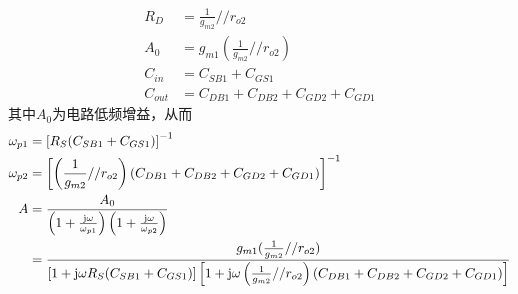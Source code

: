 \documentclass[hyperref, UTF8]{ctexart}
\newcommand{\under}[1]{\frac{1}{#1}}
\newcommand{\J}{{\rm j}}
\begin{document}
    \begin{align*}
        R_D & = \under{g_{m2}} // r_{o2} \\
        A_0 & = g_{m1}(\under{g_{m2}}//r_{o2}) \\
        C_{in} & = C_{SB1}+C_{GS1} \\
        C_{out} & = C_{DB1}+C_{DB2}+C_{GD2}+C_{GD1}
    \end{align*}
    其中$A_0$为电路低频增益，从而
    \begin{align*}
        \omega_{p1} & = \left[ R_S 
            (C_{SB1}+C_{GS1})
            \right] ^ {-1} \\
        \omega_{p2} & = \left[ \left(\under{g_{m2}} // r_{o2} \right)
            (C_{DB1}+C_{DB2}+C_{GD2}+C_{GD1})
            \right] ^ {-1}\\
        A & = \frac{A_0}{
            \left( 1 + \frac{\J \omega}{\omega_{p1}}
            \right)
            \left( 1 + \frac{\J \omega}{\omega_{p2}} \right)
        } \\
        & = \frac{g_{m1}(\under{g_{m2}}//r_{o2})}{
            \left[ 1 + \J \omega R_S 
            (C_{SB1}+C_{GS1}) \right]
            \left[ 1 + \J \omega \left(\under{g_{m2}} // r_{o2}\right)
            (C_{DB1}+C_{DB2}+C_{GD2}+C_{GD1}) \right]
        }
    \end{align*}
\end{document}
